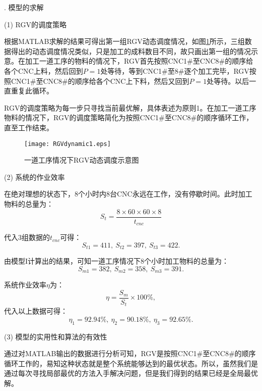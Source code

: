 \documentclass[no-math,withoutpreface,bwprint]{cumcmthesis} %
\numberwithin{equation}{section}
\numberwithin{figure}{section}
\numberwithin{table}{section}
\begin{document}
. 模型的求解

\noindent(1) RGV的调度策略

根据MATLAB求解的结果可得出第一组RGV动态调度情况，如图\ref{figdy1}所示，三组数据得出的动态调度情况类似，只是加工的成料数目不同，故只画出第一组的情况示意。在加工一道工序的物料的情况下，RGV首先按照CNC1\#至CNC8\#的顺序给各个CNC上料，然后回到$P=1$处等待，等到CNC1\#至8\#逐个加工完毕，RGV按照CNC1\#至CNC8\#的顺序给各个CNC上下料，然后又回到$P=1$处等待。以后一直重复此循环。

RGV的调度策略为每一步只寻找当前最优解，具体表述为原则1。在加工一道工序物料的情况下，RGV的调度策略简化为按照CNC1\#至CNC8\#的顺序循环工作，直至工作结束。

\begin{figure}[!htbp]
	\hspace{-0.5cm}
	\texttt{[image: RGVdynamic1.eps]}
	\caption{一道工序情况下RGV动态调度示意图}
     \label{figdy1}
\end{figure}


\noindent(2) 系统的作业效率

在绝对理想的状态下，8个小时内8台CNC永远在工作，没有停歇时间。此时加工物料的总量为：
\begin{equation}
\label{eqst1}
S_t=\dfrac{8\times60\times60\times8}{t_{cnc}}
\end{equation}

代入3组数据的$t_{cnc}$可得：$$S_{t1}=411,\ S_{t2}=397,\ S_{t3}=422.$$

由模型I计算出的结果，可知一道工序情况下8个小时加工物料的总量为：$$S_{m1}=382,\ S_{m2}=358,\ S_{m3}=391.$$

系统作业效率$\eta$为：
\begin{equation}
\eta=\dfrac{S_m}{S_t}\times100\%,
\end{equation}
代入以上数据可得：$$\eta_1=92.94\%,\ \eta_2=90.18\%,\ \eta_3=92.65\%.$$

\noindent(3) 模型的实用性和算法的有效性

通过对MATLAB输出的数据进行分析可知，RGV是按照CNC1\#至CNC8\#的顺序循环工作的，易知这种状态就是整个系统能够达到的最优状态。所以，虽然我们是通过每次寻找局部最优的方法入手解决问题，但是我们得到的结果已经是全局最优解。
\end{document}
